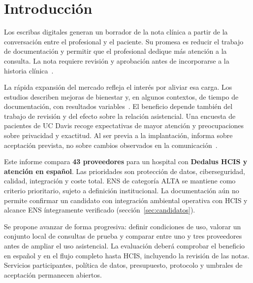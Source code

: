 \section{Introducción}
\label{sec:introduccion}
\label{sec:resumen}
Los escribas digitales generan un borrador de la nota clínica a partir de la conversación entre el profesional y el paciente. Su promesa es reducir el trabajo de documentación y permitir que el profesional dedique más atención a la consulta. La nota requiere revisión y aprobación antes de incorporarse a la historia clínica~\cite{7MXFHMBA}.

La rápida expansión del mercado refleja el interés por aliviar esa carga. Los estudios describen mejoras de bienestar y, en algunos contextos, de tiempo de documentación, con resultados variables~\cite{FKHM4UFL,4PZBAAZ7}. El beneficio depende también del trabajo de revisión y del efecto sobre la relación asistencial. Una encuesta de pacientes de UC Davis recoge expectativas de mayor atención y preocupaciones sobre privacidad y exactitud. Al ser previa a la implantación, informa sobre aceptación prevista, no sobre cambios observados en la comunicación~\cite{54NFKG36}.

Este informe compara \textbf{43 proveedores} para un hospital con \textbf{Dedalus HCIS y atención en español}. Las prioridades son protección de datos, ciberseguridad, calidad, integración y coste total. ENS de categoría ALTA se mantiene como criterio prioritario, sujeto a definición institucional. La documentación aún no permite confirmar un candidato con integración ambiental operativa con HCIS y alcance ENS íntegramente verificado (sección~\ref{sec:candidatos}).

Se propone avanzar de forma progresiva: definir condiciones de uso, valorar un conjunto local de consultas de prueba y comparar entre uno y tres proveedores antes de ampliar el uso asistencial. La evaluación deberá comprobar el beneficio en español y en el flujo completo hasta HCIS, incluyendo la revisión de las notas. Servicios participantes, política de datos, presupuesto, protocolo y umbrales de aceptación permanecen abiertos.
